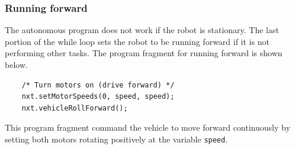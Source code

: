 \subsubsection*{Running forward}
The autonomous program does not work if the robot is stationary.
The last portion of the while loop sets the robot to be running forward if it is not performing other tasks.
The program fragment for running forward is shown below.
\begin{verbatim}
    /* Turn motors on (drive forward) */
    nxt.setMotorSpeeds(0, speed, speed);
    nxt.vehicleRollForward();
\end{verbatim}
This program fragment command the vehicle to move forward continuously by setting both motors rotating positively at
the variable \verb+speed+.
